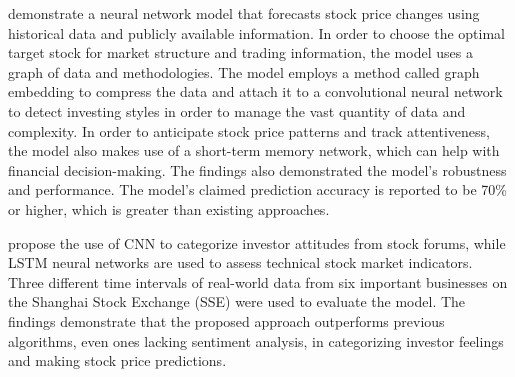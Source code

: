 \documentclass[a4paper]{article}
\begin{document}
\textbf{\cite{long2020integrated}} demonstrate a neural network model that forecasts stock price changes using historical data and publicly available information. In order to choose the optimal target stock for market structure and trading information, the model uses a graph of data and methodologies. The model employs a method called graph embedding to compress the data and attach it to a convolutional neural network to detect investing styles in order to manage the vast quantity of data and complexity. In order to anticipate stock price patterns and track attentiveness, the model also makes use of a short-term memory network, which can help with financial decision-making. The findings also demonstrated the model's robustness and performance. The model's claimed prediction accuracy is reported to be 70\% or higher, which is greater than existing approaches.

\textbf{\cite{jing2021hybrid}} propose the use of CNN to categorize investor attitudes from stock forums, while LSTM neural networks are used to assess technical stock market indicators. Three different time intervals of real-world data from six important businesses on the Shanghai Stock Exchange (SSE) were used to evaluate the model. The findings demonstrate that the proposed approach outperforms previous algorithms, even ones lacking sentiment analysis, in categorizing investor feelings and making stock price predictions.
\end{document}
